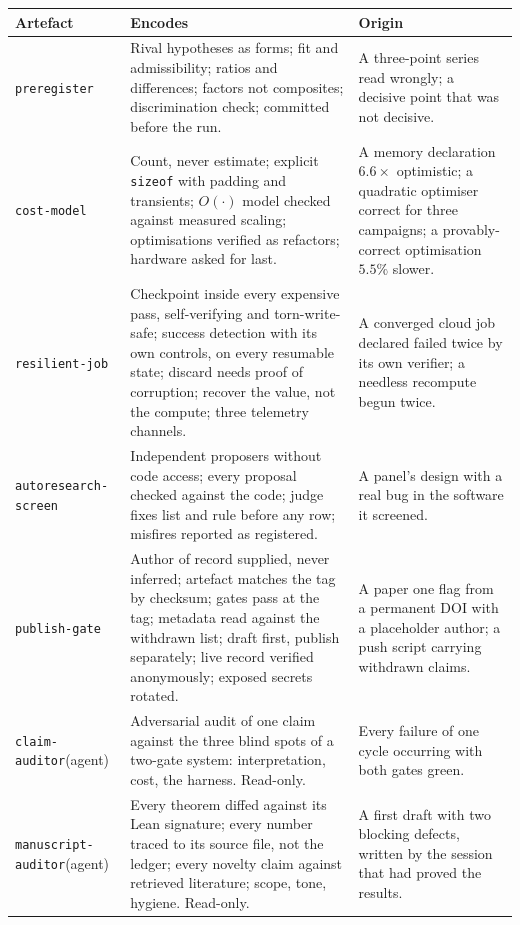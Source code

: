 \documentclass[11pt]{article}
\begin{document}
\begin{center}
\small
\begin{tabular}{@{}p{3.6cm}p{6.3cm}p{4.9cm}@{}}
\toprule
\textbf{Artefact} & \textbf{Encodes} & \textbf{Origin} \\
\midrule
\texttt{preregister} & Rival hypotheses as forms; fit and admissibility; ratios and
differences; factors not composites; discrimination check; committed before the run. & A
three-point series read wrongly; a decisive point that was not decisive. \\
\texttt{cost-model} & Count, never estimate; explicit \texttt{sizeof} with padding and
transients; $O(\cdot)$ model checked against measured scaling; optimisations verified as
refactors; hardware asked for last. & A memory declaration $6.6\times$ optimistic; a quadratic
optimiser correct for three campaigns; a provably-correct optimisation $5.5\%$ slower. \\
\texttt{resilient-job} & Checkpoint inside every expensive pass, self-verifying and
torn-write-safe; success detection with its own controls, on every resumable state; discard
needs proof of corruption; recover the value, not the compute; three telemetry channels. & A
converged cloud job declared failed twice by its own verifier; a needless recompute begun
twice. \\
\texttt{autoresearch-screen} & Independent proposers without code access; every proposal
checked against the code; judge fixes list and rule before any row; misfires reported as
registered. & A panel's design with a real bug in the software it screened. \\
\texttt{publish-gate} & Author of record supplied, never inferred; artefact matches the tag by
checksum; gates pass at the tag; metadata read against the withdrawn list; draft first,
publish separately; live record verified anonymously; exposed secrets rotated. & A paper one
flag from a permanent DOI with a placeholder author; a push script carrying withdrawn claims. \\
\texttt{claim-auditor}\newline(agent) & Adversarial audit of one claim against the three blind spots
of a two-gate system: interpretation, cost, the harness. Read-only. & Every failure of one
cycle occurring with both gates green. \\
\texttt{manuscript-auditor}\newline(agent) & Every theorem diffed against its Lean signature; every
number traced to its source file, not the ledger; every novelty claim against retrieved
literature; scope, tone, hygiene. Read-only. & A first draft with two blocking defects,
written by the session that had proved the results. \\
\bottomrule
\end{tabular}
\end{center}
\end{document}
